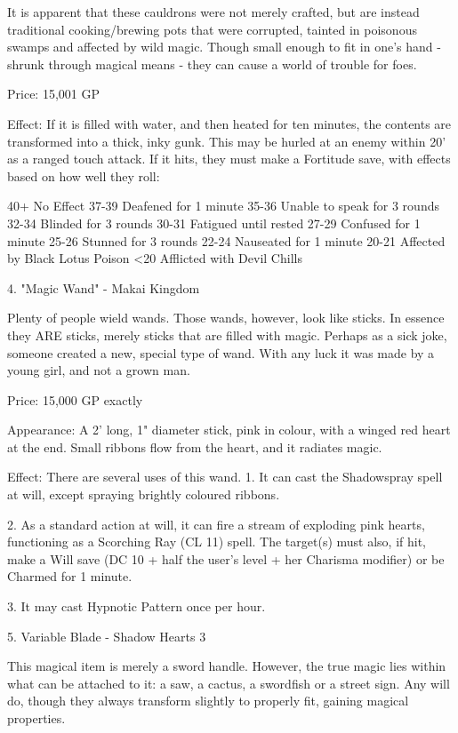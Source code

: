 \begin{multicols}{2}
It is apparent that these cauldrons were not merely crafted, but are instead traditional cooking/brewing pots that were corrupted, tainted in poisonous swamps and affected by wild magic. Though small enough to fit in one's hand - shrunk through magical means - they can cause a world of trouble for foes.

Price: 15,001 GP

Effect: If it is filled with water, and then heated for ten minutes, the contents are transformed into a thick, inky gunk. This may be hurled at an enemy within 20' as a ranged touch attack. If it hits, they must make a Fortitude save, with effects based on how well they roll:

40+ No Effect
37-39 Deafened for 1 minute
35-36 Unable to speak for 3 rounds
32-34 Blinded for 3 rounds
30-31 Fatigued until rested
27-29 Confused for 1 minute
25-26 Stunned for 3 rounds
22-24 Nauseated for 1 minute
20-21 Affected by Black Lotus Poison
<20 Afflicted with Devil Chills


4. "Magic Wand" - Makai Kingdom

Plenty of people wield wands. Those wands, however, look like sticks. In essence they ARE sticks, merely sticks that are filled with magic. Perhaps as a sick joke, someone created a new, special type of wand. With any luck it was made by a young girl, and not a grown man.

Price: 15,000 GP exactly

Appearance: A 2' long, 1" diameter stick, pink in colour, with a winged red heart at the end. Small ribbons flow from the heart, and it radiates magic.

Effect:
There are several uses of this wand.
1. It can cast the Shadowspray spell at will, except spraying brightly coloured ribbons.

2. As a standard action at will, it can fire a stream of exploding pink hearts, functioning as a Scorching Ray (CL 11) spell. The target(s) must also, if hit, make a Will save (DC 10 + half the user's level + her Charisma modifier) or be Charmed for 1 minute.

3. It may cast Hypnotic Pattern once per hour.


5. Variable Blade - Shadow Hearts 3

This magical item is merely a sword handle. However, the true magic lies within what can be attached to it: a saw, a cactus, a swordfish or a street sign. Any will do, though they always transform slightly to properly fit, gaining magical properties.


\end{multicols}
